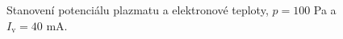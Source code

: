 \documentclass[a4paper,12pt]{article}
\begin{document}
\begin{figure}[h]
	\centering
	\begin{subfigure}[b]{.49\textwidth}
		\centering
	\end{subfigure}
	\begin{subfigure}[b]{.49\textwidth}
		\centering
	\end{subfigure}
	\caption{Stanovení potenciálu plazmatu a elektronové teploty, $p = 100$ \si{\pascal} a $I_\text{v} = 40$ \si{\milli\ampere}.}
	\label{data0}
\end{figure}
\end{document}
